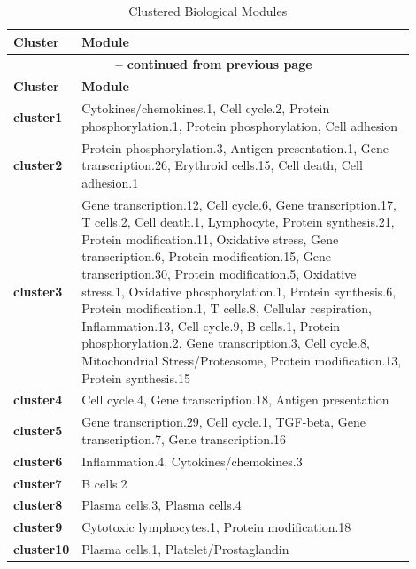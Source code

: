 \documentclass[12pt,a4paper]{report}
\begin{document}
\begin{longtable}{l p{0.9\linewidth} }
\caption{Clustered Biological Modules}\label{tab:clustered_terms_RNA}\\
\toprule
\textbf{Cluster} & \textbf{Module} \\
\midrule
\endfirsthead

\multicolumn{2}{c}{%
{\bfseries \tablename\ \thetable{} -- continued from previous page}} \\
\toprule
\textbf{Cluster} & \textbf{Module} \\
\midrule
\endhead

\bottomrule
\endfoot

\bottomrule
\endlastfoot

\textbf{cluster1} & Cytokines/chemokines.1, Cell cycle.2, Protein phosphorylation.1, Protein phosphorylation, Cell adhesion \\
\addlinespace
\textbf{cluster2} & Protein phosphorylation.3, Antigen presentation.1, Gene transcription.26, Erythroid cells.15, Cell death, Cell adhesion.1 \\
\addlinespace
\textbf{cluster3} & Gene transcription.12, Cell cycle.6, Gene transcription.17, T cells.2, Cell death.1, Lymphocyte, Protein synthesis.21, Protein modification.11, Oxidative stress, Gene transcription.6, Protein modification.15, Gene transcription.30, Protein modification.5, Oxidative stress.1, Oxidative phosphorylation.1, Protein synthesis.6, Protein modification.1, T cells.8, Cellular respiration, Inflammation.13, Cell cycle.9, B cells.1, Protein phosphorylation.2, Gene transcription.3, Cell cycle.8, Mitochondrial Stress/Proteasome, Protein modification.13, Protein synthesis.15 \\
\addlinespace
\textbf{cluster4} & Cell cycle.4, Gene transcription.18, Antigen presentation \\
\addlinespace
\textbf{cluster5} & Gene transcription.29, Cell cycle.1, TGF-beta, Gene transcription.7, Gene transcription.16 \\
\addlinespace
\textbf{cluster6} & Inflammation.4, Cytokines/chemokines.3 \\
\addlinespace
\textbf{cluster7} & B cells.2 \\
\addlinespace
\textbf{cluster8} & Plasma cells.3, Plasma cells.4 \\
\addlinespace
\textbf{cluster9} & Cytotoxic lymphocytes.1, Protein modification.18 \\
\addlinespace
\textbf{cluster10} & Plasma cells.1, Platelet/Prostaglandin \\

\end{longtable}
\end{document}
